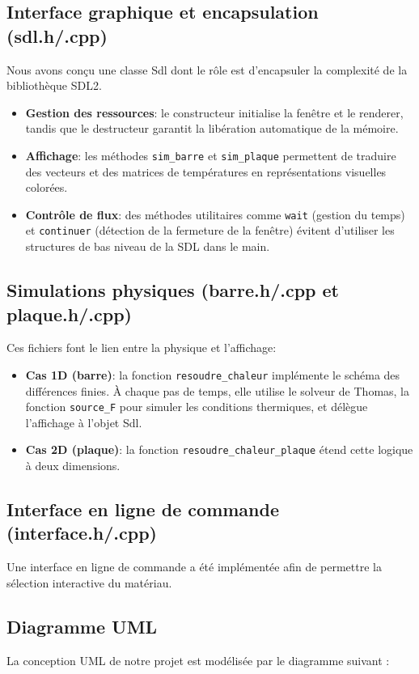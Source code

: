 \documentclass[a4paper,12pt]{article}
\begin{document}
\subsection{Interface graphique et encapsulation (sdl.h/.cpp)}
Nous avons conçu une classe Sdl dont le rôle est d'encapsuler la complexité de la bibliothèque SDL2.

\begin{itemize}
    \item \textbf{Gestion des ressources}: le constructeur initialise la fenêtre et le renderer, tandis que le destructeur garantit la libération automatique de la mémoire.
    \item \textbf{Affichage}: les méthodes \texttt{sim\_barre} et \texttt{sim\_plaque} permettent de traduire des vecteurs et des matrices de températures en représentations visuelles colorées.
    \item \textbf{Contrôle de flux}: des méthodes utilitaires comme \texttt{wait} (gestion du temps) et \texttt{continuer} (détection de la fermeture de la fenêtre) évitent d'utiliser les structures de bas niveau de la SDL dans le main.
\end{itemize}

\subsection{Simulations physiques (barre.h/.cpp et plaque.h/.cpp)}
Ces fichiers font le lien entre la physique et l'affichage:

\begin{itemize}
    \item \textbf{Cas 1D (barre)}: la fonction \texttt{resoudre\_chaleur} implémente le schéma des différences finies. À chaque pas de temps, elle utilise le solveur de Thomas, la fonction \texttt{source\_F} pour simuler les conditions thermiques, et délègue l'affichage à l'objet Sdl.
    \item \textbf{Cas 2D (plaque)}: la fonction \texttt{resoudre\_chaleur\_plaque} étend cette logique à deux dimensions.
\end{itemize}

\subsection{Interface en ligne de commande (interface.h/.cpp)}
Une interface en ligne de commande a été implémentée afin de permettre la sélection interactive du matériau.

\subsection{Diagramme UML}
La conception UML de notre projet est modélisée par le diagramme suivant :
\end{document}
